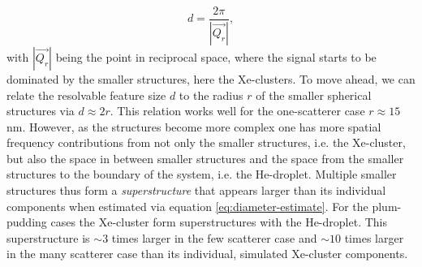\begin{equation}
d = \frac{2\pi}{\left|\vec{Q_{r}}\right|},
\label{eq:diameter-estimate}
\end{equation}
with $\left|\vec{Q_{r}}\right|$ being the point in reciprocal space, where the signal starts to be dominated by the smaller structures, here the Xe-clusters. To move ahead, we can relate the resolvable feature size $d$ to the radius $r$ of the smaller spherical structures via $d\approx 2 r$. This relation works well for the one-scatterer case $r\approx 15$ nm. However, as the structures become more complex one has more spatial frequency contributions from not only the smaller structures, i.e. the Xe-cluster, but also the space in between smaller structures and the space from the smaller structures to the boundary of the system, i.e. the He-droplet. Multiple smaller structures thus form a \textit{superstructure} that appears larger than its individual components when estimated via equation \eqref{eq:diameter-estimate}. For the plum-pudding cases the Xe-cluster form superstructures with the He-droplet. This superstructure is $\sim 3$ times larger in the few scatterer case and $\sim 10$ times larger in the many scatterer case than its individual, simulated Xe-cluster components.\\
